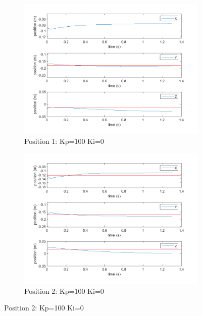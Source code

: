 \begin{figure}[ht]
    \centering

    \begin{subfigure}[b]{0.45\textwidth}
        \centering
        \includegraphics[width=\linewidth]{Pictures/Controller/Kp100Ki0/1.png}
        \caption{Position 1: Kp=100 Ki=0}
    \end{subfigure}%
    \hfill
    \begin{subfigure}[b]{0.45\textwidth}
        \centering
        \includegraphics[width=\linewidth]{Pictures/Controller/Kp100Ki0/17.png}
        \caption{Position 2: Kp=100 Ki=0}
    \end{subfigure}


\end{figure}
